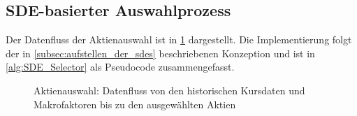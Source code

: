 \subsection{SDE-basierter Auswahlprozess}\label{subsec:sde_datenfluss}
Der Datenfluss der Aktienauswahl ist in \cref{fig:sde_aktienauswahl} dargestellt. Die Implementierung folgt der in \cref{subsec:aufstellen_der_sdes} beschriebenen Konzeption und ist in \cref{alg:SDE_Selector} als Pseudocode zusammengefasst.

\begin{figure}[H]
    \centering
    
    \caption{Aktienauswahl: Datenfluss von den historischen Kursdaten und Makrofaktoren bis zu den ausgewählten Aktien}\label{fig:sde_aktienauswahl}
\end{figure}

